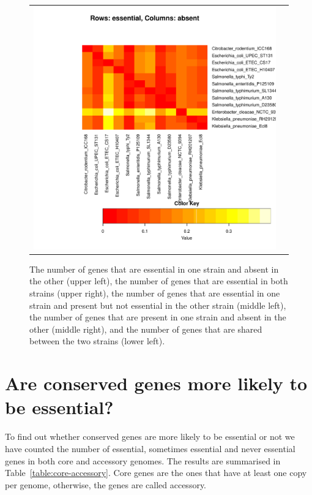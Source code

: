 \documentclass[a4paper,10pt, twocolumn]{article}
\begin{document}
\begin{figure}
\begin{tabular}{c c}
\includegraphics[page=5, scale=0.35]{essentiality-heatmap.pdf} & 
\\
\end{tabular}
\caption{The number of genes that are essential in one strain and absent in the other (upper left), the number of genes that are essential in both strains (upper right), the number of genes that are essential in one strain and present but not essential in the other strain (middle left), the number of genes that are present in one strain and absent in the other (middle right), and the number of genes that are shared between the two strains (lower left).}
\label{fig:pairwise-venn}
\end{figure}

\section{Are conserved genes more likely to be essential?}
To find out whether conserved genes are more likely to be essential or not we have counted the number of essential, sometimes essential and never essential genes in both core and accessory genomes. The results are summarised in Table~\ref{table:core-accessory}. Core genes are the ones that have at least one copy per genome, otherwise, the genes are called accessory.
\end{document}

